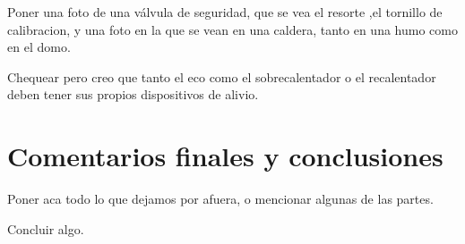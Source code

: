 Poner una foto de una válvula de seguridad, que se vea el resorte ,el tornillo de calibracion, y una foto en la que se vean en una caldera, tanto en una humo como en el domo.

Chequear pero creo que tanto el eco como el sobrecalentador o el recalentador deben tener sus propios dispositivos de alivio.








\newpage
\section{Comentarios finales y conclusiones}

Poner aca todo lo que dejamos por afuera, o mencionar algunas de las partes.

Concluir algo.























